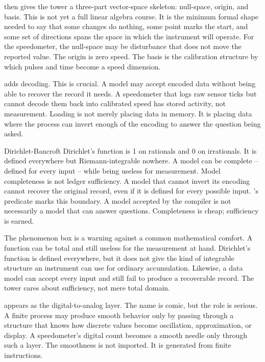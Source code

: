  then gives the tower a three-part vector-space skeleton:
null-space, origin, and basis. This is not yet a full linear algebra course.
It is the minimum formal shape needed to say that some changes do nothing, some
point marks the start, and some set of directions spans the space in which the
instrument will operate. For the speedometer, the null-space may be
disturbance that does not move the reported value. The origin is zero speed.
The basis is the calibration structure by which pulses and time become a
speed dimension.

 adds decoding. This is crucial. A model may accept encoded data
without being able to recover the record it needs. A speedometer that logs raw
sensor ticks but cannot decode them back into calibrated speed has stored
activity, not measurement. Loading is not merely placing data in memory. It is
placing data where the process can invert enough of the encoding to answer the
question being asked.

\begin{gphenom}{Dirichlet-Bancroft}
\label{ph:dirichlet-bancroft}
\GPhObs Dirichlet's function is 1 on rationals and 0 on irrationals. It is
defined everywhere but Riemann-integrable nowhere. A model can be complete --
defined for every input -- while being useless for measurement.
\GPhCon Model completeness is not ledger sufficiency. A model that cannot
invert its encoding cannot recover the original record, even if it is defined
for every possible input.
\GPhSeq {}'s  predicate marks this boundary. A model
accepted by the compiler is not necessarily a model that can answer questions.
Completeness is cheap; sufficiency is earned.
\end{gphenom}

The phenomenon box is a warning against a common mathematical comfort. A
function can be total and still useless for the measurement at hand. Dirichlet's
function is defined everywhere, but it does not give the kind of integrable
structure an instrument can use for ordinary accumulation. Likewise, a data
model can accept every input and still fail to produce a recoverable record.
The tower cares about sufficiency, not mere total domain.

 appears as the digital-to-analog layer. The name is
comic, but the role is serious. A finite process may produce smooth behavior
only by passing through a structure that knows how discrete values become
oscillation, approximation, or display. A speedometer's digital count becomes a
smooth needle only through such a layer. The smoothness is not imported. It is
generated from finite instructions.

